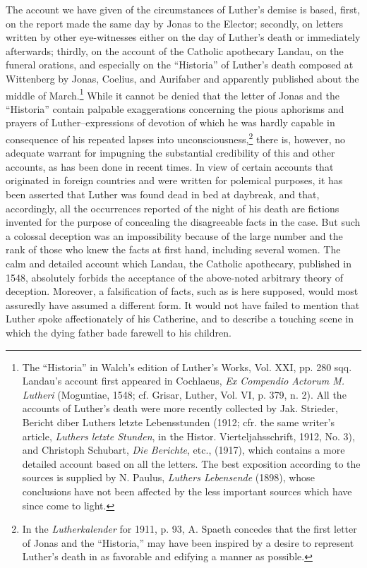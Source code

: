 The account we have given of the circumstances of Luther’s demise
is based, first, on the report made the same day by Jonas to the
Elector; secondly, on letters written by other eye-witnesses either on
the day of Luther’s death or immediately afterwards; thirdly, on the
account of the Catholic apothecary Landau, on the funeral orations,
and especially on the “Historia” of Luther’s death composed at Wittenberg
by Jonas, Coelius, and Aurifaber and apparently published
about the middle of March.\footnote{The “Historia” in Walch’s edition of Luther’s Works, Vol. XXI, pp. 280 sqq. Landau’s
account first appeared in Cochlaeus, \textit{Ex Compendio Actorum M. Lutheri} (Moguntiae, 1548;
cf. Grisar, Luther, Vol. VI, p. 379, n. 2). All the accounts of Luther’s death were more
recently collected by Jak. Strieder, Bericht diber Luthers letzte Lebensstunden (1912; cfr.
the same writer’s article, \textit{Luthers letzte Stunden}, in the Histor. Vierteljahsschrift, 1912,
No. 3), and Christoph Schubart, \textit{Die Berichte}, etc., (1917), which contains a more detailed
account based on all the letters. The best exposition according to the sources is supplied
by N. Paulus, \textit{Luthers Lebensende} (1898), whose conclusions have not been affected by the
less important sources which have since come to light.}
While it cannot be denied that the
letter of Jonas and the “Historia” contain palpable exaggerations
concerning the pious aphorisms and prayers of Luther--expressions
of devotion of which he was hardly capable in consequence of his
repeated lapses into unconsciousness,\footnote
{In the \textit{Lutherkalender} for 1911, p. 93, A. Spaeth concedes that the first letter of Jonas
and the “Historia,” may have been inspired by a desire to represent Luther’s death in as
favorable and edifying a manner as possible.}
there is, however, no adequate
warrant for impugning the substantial credibility of this and other
accounts, as has been done in recent times. In view of certain accounts
that originated in foreign countries and were written for polemical purposes,
it has been asserted that Luther was found dead in bed at daybreak,
and that, accordingly, all the occurrences reported of the night
of his death are fictions invented for the purpose of concealing
the disagreeable facts in the case. But such a colossal deception was
an impossibility because of the large number and the rank of those
who knew the facts at first hand, including several women. The calm
and detailed account which Landau, the Catholic apothecary, published
in 1548, absolutely forbids the acceptance of the above-noted
arbitrary theory of deception. Moreover, a falsification of facts, such as
is here supposed, would most assuredly have assumed a different form.
It would not have failed to mention that Luther spoke affectionately
of his Catherine, and to describe a touching scene in which the dying
father bade farewell to his children.

